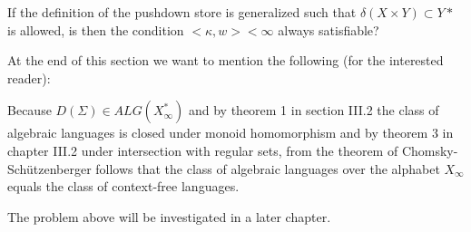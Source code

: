 If the definition of the pushdown store is generalized such that $\delta(X
\times Y) \subset Y*$ is allowed, is then the condition $<\kappa, w> <
\infty$ always satisfiable?

At the end of this section we want to mention the following (for the interested
reader):

Because $D(\Sigma) \in ALG(X_\infty^*)$ and by theorem 1 in section III.2 the
class of algebraic languages is closed under monoid homomorphism and by theorem
3 in chapter III.2 under intersection with regular sets, from the theorem of
Chomsky-Schützenberger follows that the class of algebraic languages over the
alphabet $X_\infty$ equals the class of context-free languages.

The problem above will be investigated in a later chapter.
